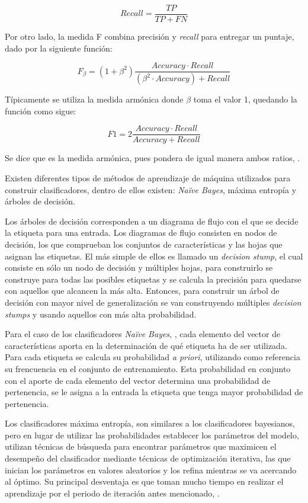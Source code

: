 \[
	Recall = \frac{TP}{TP+FN}
\]

Por otro lado, la medida F combina precisión y \textit{recall} para entregar un puntaje, dado por la siguiente función:

\[
	F_{\beta} = (1+\beta^{2})\frac{Accuracy · Recall}{(\beta^{2} · Accuracy) + Recall}
\]

Típicamente se utiliza la medida armónica donde $\beta$ toma el valor 1, quedando la función como sigue:

\[
	F1 = 2\frac{Accuracy · Recall}{ Accuracy + Recall}
\]

Se dice que es la medida armónica, pues pondera de igual manera ambos ratios, \cite{FMeasureInterpret}.

Existen diferentes tipos de métodos de aprendizaje de máquina utilizados para construir clasificadores, dentro de ellos existen: \textit{Naïve Bayes}, máxima entropía y árboles de decisión.

Los árboles de decisión corresponden a un diagrama de flujo con el que se decide la etiqueta para una entrada. Los diagramas de flujo consisten en nodos de decisión, los que comprueban los conjuntos de características y las hojas que asignan las etiquetas. El más simple de ellos es llamado un \textit{decision stump}, el cual consiste en sólo un nodo de decisión y múltiples hojas, para construirlo se construye para todas las posibles etiquetas y se calcula la precisión para quedarse con aquellos que alcancen la más alta. Entonces, para construir un árbol de decisión con mayor nivel de generalización se van construyendo múltiples \textit{decision stumps} y usando aquellos con más alta probabilidad.

Para el caso de los clasificadores \textit{Naïve Bayes}, \cite{NaiveBayes2}, cada elemento del vector de características aporta en la determinación de qué etiqueta ha de ser utilizada. Para cada etiqueta se calcula su probabilidad \textit{a priori}, utilizando como referencia su frencuencia en el conjunto de entrenamiento. Esta probabilidad en conjunto con el aporte de cada elemento del vector determina una probabilidad de pertenencia, se le asigna a la entrada la etiqueta que tenga mayor probabilidad de pertenencia.

Los clasificadores máxima entropía, son similares a los clasificadores bayesianos, pero en lugar de utilizar las probabilidades establecer los parámetros del modelo, utilizan técnicas de búsqueda para encontrar parámetros que maximicen el desempeño del clasificador mediante técnicas de optimización iterativa, las que inician los parámetros en valores aleatorios y los refina mientras se va acercando al óptimo. Su principal desventaja es que toman mucho tiempo en realizar el aprendizaje por el periodo de iteración antes mencionado, \cite{NPLK}.

